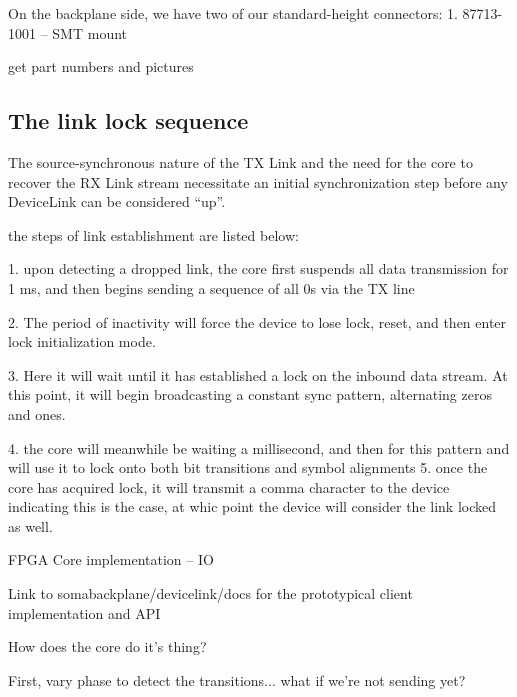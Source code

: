 On the backplane side, we have two of our standard-height connectors: 
  1. 87713-1001 -- SMT mount

get part numbers and pictures



\subsection{The link lock sequence}


The source-synchronous nature of the TX Link and the need for the core to recover the RX Link stream necessitate an initial synchronization step before any DeviceLink can be considered ``up''. 


the steps of link establishment are listed below: 

1. upon detecting a dropped link, the core first suspends all data transmission for 1 ms, and then begins sending a sequence of all 0s via the TX line


2. The period of inactivity will force the device to lose lock, reset, and then enter lock initialization mode. 

3. Here it will wait until it has established a lock on the inbound data stream. At this point, it will begin broadcasting a constant sync pattern, alternating zeros and ones. 

4. the core will meanwhile be waiting a millisecond, and then  for this pattern and will use it to lock onto both bit transitions and symbol alignments
5. once the core has acquired lock, it will transmit a comma character to the device indicating this is the case, at whic point the device will consider the link locked as well. 

FPGA Core implementation -- IO 

Link to somabackplane/devicelink/docs for the prototypical client implementation and API 



How does the core do it's thing? 

First, vary phase to detect the transitions... what if we're not sending yet? 

